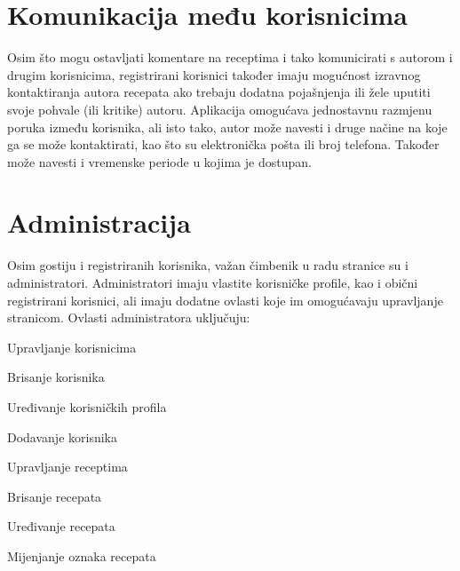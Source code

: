 		\section{Komunikacija među korisnicima}
		Osim što mogu ostavljati komentare na receptima i tako komunicirati s autorom i drugim korisnicima, registrirani korisnici također imaju mogućnost izravnog kontaktiranja autora recepata ako trebaju dodatna pojašnjenja ili žele uputiti svoje pohvale (ili kritike) autoru. Aplikacija omogućava jednostavnu razmjenu poruka između korisnika, ali isto tako, autor može navesti i druge načine na koje ga se može kontaktirati, kao što su elektronička pošta ili broj telefona. Također može navesti i vremenske periode u kojima je dostupan.
		\section{Administracija}
		Osim gostiju i registriranih korisnika, važan čimbenik u radu stranice su i administratori. Administratori imaju vlastite korisničke profile, kao i obični registrirani korisnici, ali imaju dodatne ovlasti koje im omogućavaju upravljanje stranicom.
		\linebreak
		Ovlasti administratora uključuju:
		\begin{packed_item}
			\item Upravljanje korisnicima
			\item[] \begin{packed_item}
					\item Brisanje korisnika
					\item Uređivanje korisničkih profila
					\item Dodavanje korisnika
					\end{packed_item}
			\item Upravljanje receptima
			\item[] \begin{packed_item}
					\item Brisanje recepata
					\item Uređivanje recepata
					\item Mijenjanje oznaka recepata
					\end{packed_item}
		\end{packed_item}
		
	